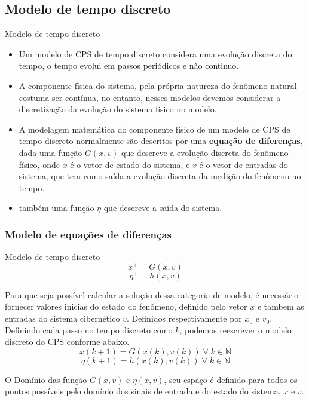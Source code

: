 \documentclass{beamer}
\begin{document}
\subsection{Modelo de tempo discreto}
\begin{frame}{Modelo de tempo discreto}
	\begin{itemize}
		\item Um modelo de CPS de tempo discreto considera uma evolução discreta do tempo,
		o tempo evolui em passos periódicos e não continuo.
		\item A componente física do sistema, pela própria natureza do fenômeno natural costuma ser contínua,
		no entanto, nesses modelos devemos considerar a discretização da evolução do sistema físico no modelo.
		\item A modelagem matemática do componente físico de um modelo de CPS de tempo discreto normalmente são descritos por uma \textbf{equação de diferenças}, dada uma função $G(x,v)$ que descreve a evolução discreta do fenômeno físico, onde $x$ é o vetor de estado do sistema,  e $v$ é o vetor de entradas do sistema,
		que tem como saída a evolução discreta da medição do fenômeno no tempo.
		\item também uma função $\eta$ que descreve a saída do sistema.
	\end{itemize}
	
\end{frame}

\subsubsection{Modelo de equações de diferenças}

\begin{frame}{Modelo de tempo discreto}
	\begin{equation}
		x^{+}=G(x,v)
	\end{equation}
	\begin{equation}
		\eta^{+}=h(x,v)
	\end{equation}
	\par Para que seja possível calcular a solução dessa categoria de modelo, é necessário fornecer valores inicias do estado do fenômeno, definido pelo vetor $x$ e tambem as entradas do sistema cibernético $v$.
	Definidos respectivamente por $x_0$ e $v_0$.
	Definindo cada passo no tempo discreto como $k$, podemos reescrever o modelo discreto do CPS conforme abaixo.
	\begin{equation}
		x(k+1)=G(x(k),v(k))\;\forall\;k  \in \mathbb{N}
	\end{equation}
	\begin{equation}
		\eta(k+1)=h(x(k),v(k))\;\forall\;k  \in \mathbb{N}
	\end{equation}
	\par O Domínio das função $G(x,v)$ e $\eta(x,v)$, seu espaço é definido para todos os pontos possíveis pelo domínio dos sinais de entrada e do estado do sistema, $x$ e $v$.
\end{frame}
\end{document}
